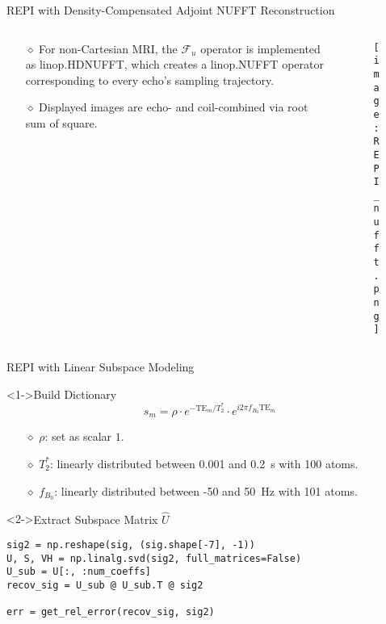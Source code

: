 \begin{frame}{REPI with Density-Compensated Adjoint NUFFT Reconstruction}
{\large
\begin{columns}
\begin{column}{0.55\textwidth}
\begin{itemize}
	\item [$\diamond$] For non-Cartesian MRI, the $\mathcal{F}_u$ operator is implemented as linop.HDNUFFT, which creates a linop.NUFFT operator corresponding to every echo's sampling trajectory.
	\vspace{1em}
	\item [$\diamond$] Displayed images are echo- and coil-combined via root sum of square.
\end{itemize}
\end{column}

\begin{column}{0.45\textwidth}
\begin{figure}
	\texttt{[image: REPI\_nufft.png]}
\end{figure}
\end{column}

\end{columns}}
\end{frame}


\begin{frame}[fragile]{REPI with Linear Subspace Modeling}
{\large
\begin{block}<1->{Build Dictionary}
\begin{equation}
	s_m = \rho \cdot e^{- \text{TE}_m / T_2^*} \cdot e^{i 2\pi f_{B_0} \text{TE}_m}
\end{equation}
\begin{itemize}
	\item [$\diamond$] $\rho$: set as scalar $1$.
	\item [$\diamond$] $T_2^*$: linearly distributed between 0.001 and 0.2~s with 100 atoms.
	\item [$\diamond$] $f_{B_0}$: linearly distributed between -50 and 50~Hz with 101 atoms.
\end{itemize}
\end{block}}

\begin{block}<2->{Extract Subspace Matrix $\hat{U}$}
\begin{lstlisting}
sig2 = np.reshape(sig, (sig.shape[-7], -1))
U, S, VH = np.linalg.svd(sig2, full_matrices=False)
U_sub = U[:, :num_coeffs]
recov_sig = U_sub @ U_sub.T @ sig2

err = get_rel_error(recov_sig, sig2)
\end{lstlisting}
\end{block}

\end{frame}


